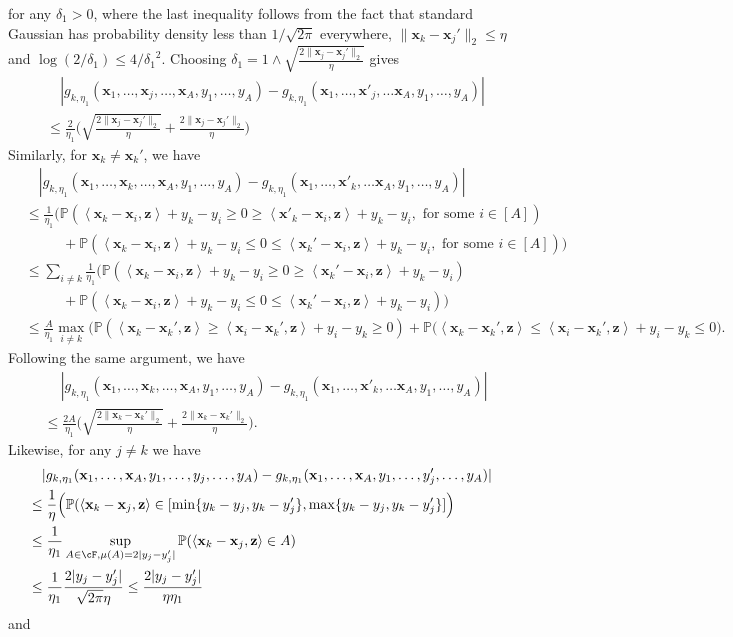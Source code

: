 \documentclass[10pt]{article}
\newcommand{\<}{\left\langle}
\renewcommand{\>}{\right\rangle}
\renewcommand{\P}{\mathbb{P}}
\newcommand{\trunprob}{{\eta_1}}
\newcommand{\Trunregp}{{\eta}}
\def\bx{{\mathbf x}}
\def\bz{{\mathbf z}}
\begin{document}
for any ${\delta_1}>0$,
where the last inequality follows from the fact that standard Gaussian has probability density less than $1/\sqrt{2\pi}$ everywhere,  $\|\bx_k-\bx_j'\|_2\leq \Trunregp$ and $\log(2/{\delta_1})\leq 4/{\delta_1}^2$. Choosing ${\delta_1}=1\wedge\sqrt{\frac{2\|\bx_j-\bx_j'\|_2}{\Trunregp}}$ gives
\begin{align*}
 &\quad |g_{k,\trunprob}(\bx_1,\ldots,\bx_j,\ldots,\bx_A,y_1,\ldots,y_A)-g_{k,\trunprob}(\bx_1,\ldots,\bx'_j,\ldots\bx_A,y_1,\ldots,y_A)|\\
 &\leq
  \frac{2}{\trunprob}\Big(\sqrt{\frac{2\|\bx_j-\bx_j'\|_2}{\Trunregp}}+\frac{2\|\bx_j-\bx_j'\|_2}{\Trunregp}\Big)
\end{align*}
Similarly, for $\bx_k\neq\bx_k'$, we have
\begin{align*}
     &\quad|g_{k,\trunprob}(\bx_1,\ldots,\bx_k,\ldots,\bx_A,y_1,\ldots,y_A)-g_{k,\trunprob}(\bx_1,\ldots,\bx'_k,\ldots\bx_A,y_1,\ldots,y_A)|
        \\
     &\leq
     \frac{1}{\trunprob}\Big(\P(\<\bx_k-\bx_i,\bz\>+y_k-y_i\geq0\geq \<\bx'_k-\bx_i,\bz\>+y_k-y_i,\text{~for some~}i\in[A])\\&\qquad~~~+\P(\<\bx_k-\bx_i,\bz\>+y_k-y_i\leq0\leq \<\bx_k'-\bx_i,\bz\>+y_k-y_i,\text{~for some~}i\in[A])\Big)
     \\
       &\leq
    \sum_{i\neq k} \frac{1}{\trunprob}\Big(\P(\<\bx_k-\bx_i,\bz\>+y_k-y_i\geq0\geq \<\bx_k'-\bx_i,\bz\>+y_k-y_i)\\&\qquad~~~+\P(\<\bx_k-\bx_i,\bz\>+y_k-y_i\leq0\leq \<\bx_k'-\bx_i,\bz\>+y_k-y_i)\Big)\\
    &\leq \frac{A}{\trunprob}\max_{i
    \neq k}\Big(\P(\<\bx_k-\bx_k',\bz\>\geq\<\bx_i-\bx_k',\bz\>+y_i-y_k\geq0 )+\P(\<\bx_k-\bx_k',\bz\>\leq \<\bx_i-\bx_k',\bz\>+y_i-y_k\leq0\Big).
\end{align*}
Following the same argument, we have
\begin{align*}
&\quad~|g_{k,\trunprob}(\bx_1,\ldots,\bx_k,\ldots,\bx_A,y_1,\ldots,y_A)-g_{k,\trunprob}(\bx_1,\ldots,\bx'_k,\ldots\bx_A,y_1,\ldots,y_A)|\\&\leq   \frac{2A}{\trunprob}\Big(\sqrt{\frac{2\|\bx_k-\bx_k'\|_2}{\Trunregp}}+\frac{2\|\bx_k-\bx_k'\|_2}{\Trunregp}\Big).
\end{align*}
Likewise, for any $j\neq k$ we have
\begin{align*}
    &\quad|g_{k,\trunprob}(\bx_1,\ldots,\bx_A,y_1,\ldots,y_j,\ldots,y_A)-g_{k,\trunprob}(\bx_1,\ldots,\bx_A,y_1,\ldots,y_j',\ldots,y_A)|\\
    &\leq
    \frac{1}{\Trunregp}
    \Big(\P( \<\bx_k-\bx_j,\bz\>\in[\min\{y_k-y_j,y_k-y_j'\},\max\{y_k-y_j,y_k-y_j'\}]\Big)\\
      &\leq
      \frac{1}{\trunprob}\sup_{A\in\cF,\mu(A)=2|y_j-y_j'|}\P(\<\bx_k-\bx_j,\bz\>\in A)\\
      &\leq
   \frac{1}{\trunprob}\frac{2|y_j-y_j'|}{\sqrt{2\pi}\Trunregp}\leq \frac{2|y_j-y_j'|}{\Trunregp\trunprob}
\end{align*} and
\end{document}
